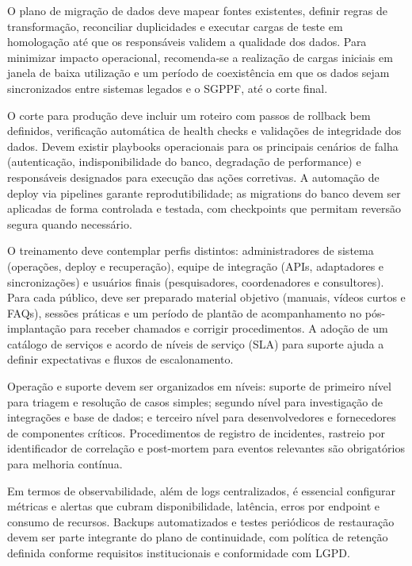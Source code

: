 \documentclass[12pt,a4paper]{article}
\begin{document}
O plano de migração de dados deve mapear fontes existentes, definir regras de transformação, reconciliar duplicidades e executar cargas de teste em homologação até que os responsáveis validem a qualidade dos dados. Para minimizar impacto operacional, recomenda-se a realização de cargas iniciais em janela de baixa utilização e um período de coexistência em que os dados sejam sincronizados entre sistemas legados e o SGPPF, até o corte final.

O corte para produção deve incluir um roteiro com passos de rollback bem definidos, verificação automática de health checks e validações de integridade dos dados. Devem existir playbooks operacionais para os principais cenários de falha (autenticação, indisponibilidade do banco, degradação de performance) e responsáveis designados para execução das ações corretivas. A automação de deploy via pipelines garante reprodutibilidade; as migrations do banco devem ser aplicadas de forma controlada e testada, com checkpoints que permitam reversão segura quando necessário.

O treinamento deve contemplar perfis distintos: administradores de sistema (operações, deploy e recuperação), equipe de integração (APIs, adaptadores e sincronizações) e usuários finais (pesquisadores, coordenadores e consultores). Para cada público, deve ser preparado material objetivo (manuais, vídeos curtos e FAQs), sessões práticas e um período de plantão de acompanhamento no pós-implantação para receber chamados e corrigir procedimentos. A adoção de um catálogo de serviços e acordo de níveis de serviço (SLA) para suporte ajuda a definir expectativas e fluxos de escalonamento.

Operação e suporte devem ser organizados em níveis: suporte de primeiro nível para triagem e resolução de casos simples; segundo nível para investigação de integrações e base de dados; e terceiro nível para desenvolvedores e fornecedores de componentes críticos. Procedimentos de registro de incidentes, rastreio por identificador de correlação e post-mortem para eventos relevantes são obrigatórios para melhoria contínua.

Em termos de observabilidade, além de logs centralizados, é essencial configurar métricas e alertas que cubram disponibilidade, latência, erros por endpoint e consumo de recursos. Backups automatizados e testes periódicos de restauração devem ser parte integrante do plano de continuidade, com política de retenção definida conforme requisitos institucionais e conformidade com LGPD.
\end{document}
